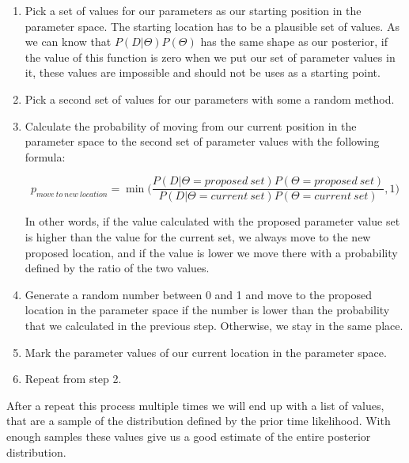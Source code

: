 \documentclass[12pt,a4paper,leqno]{report}
\theoremstyle{plain}
\theoremstyle{definition}
\theoremstyle{remark}
\begin{document}
\begin{enumerate}
    \item Pick a set of values for our parameters as our starting position in
          the parameter space. The starting location has to be a plausible set
          of values. As we can know that
          \(P(D|\Theta)P(\Theta)\) has the same shape as our posterior, if
          the value of this function is zero when we put our set of
          parameter values in it, these values are impossible and should not be
          uses as a starting point.
    \item Pick a second set of values for our parameters with some a random method.
    \item Calculate the probability of moving from our current position in the
          parameter space to the second set of parameter values with the
          following formula:

          \begin{def}\label{randomwalk}
              \begin{equation*}
                  p_{move\ to\ new\ location} = \min \bigg(\frac{P(D|\Theta = proposed\ set)P(\Theta = proposed\ set)}{P(D|\Theta = current\ set)P(\Theta = current\ set)}, 1 \bigg)
              \end{equation*}
          \end{def}

          In other words, if the value calculated with the proposed parameter
          value set is higher than the value for the current set, we always move
          to the new proposed location, and if the value
          is lower we move there with a probability defined by the ratio of the
          two values.
    \item Generate a random number between 0 and 1 and move to the proposed
          location in the parameter space if the number is lower than the
          probability that we calculated in the previous step. Otherwise, we stay
          in the same place.
    \item Mark the parameter values of our current location in the parameter space.
    \item Repeat from step 2.

\end{enumerate}

After a repeat this process multiple times we will end up with a list of values,
that are a sample of the distribution defined by the prior time
likelihood. With enough samples these values give us a good estimate of the entire
posterior distribution.
\end{document}
